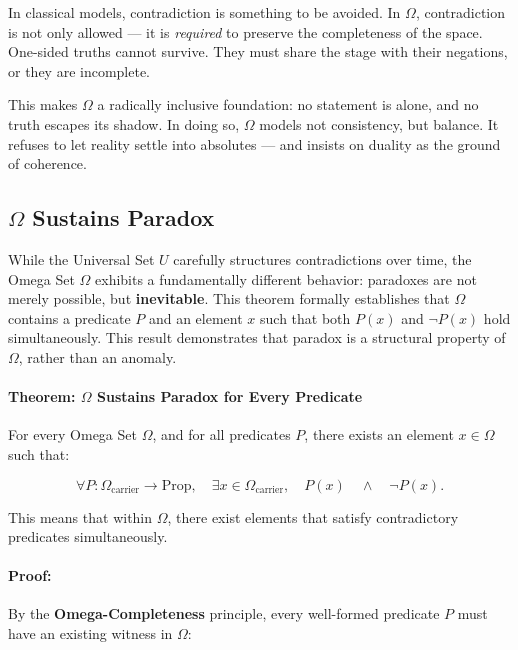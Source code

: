 \documentclass[12pt]{article}
\begin{document}
In classical models, contradiction is something to be avoided. In \( \Omega \), contradiction is not only allowed — it is \textit{required} to preserve the completeness of the space. One-sided truths cannot survive. They must share the stage with their negations, or they are incomplete.

This makes \( \Omega \) a radically inclusive foundation: no statement is alone, and no truth escapes its shadow. In doing so, \( \Omega \) models not consistency, but balance. It refuses to let reality settle into absolutes — and insists on duality as the ground of coherence.


\subsection{\( \Omega \) Sustains Paradox}

While the Universal Set \( U \) carefully structures contradictions over time, the Omega Set \( \Omega \) exhibits a fundamentally different behavior: paradoxes are not merely possible, but \textbf{inevitable}. This theorem formally establishes that \( \Omega \) contains a predicate \( P \) and an element \( x \) such that both \( P(x) \) and \( \neg P(x) \) hold simultaneously. This result demonstrates that paradox is a structural property of \( \Omega \), rather than an anomaly.

\paragraph{Theorem: \( \Omega \) Sustains Paradox for Every Predicate}
For every Omega Set \( \Omega \), and for all predicates \( P \), there exists an element \( x \in \Omega \) such that:

\begin{equation}
    \forall P: \Omega_{\text{carrier}} \to \text{Prop}, \quad
    \exists x \in \Omega_{\text{carrier}}, \quad
    P(x) \quad \wedge \quad \neg P(x).
\end{equation}

This means that within \( \Omega \), there exist elements that satisfy contradictory predicates simultaneously.

\paragraph{Proof:}
By the \textbf{Omega-Completeness} principle, every well-formed predicate \( P \) must have an existing witness in \( \Omega \):
\end{document}
